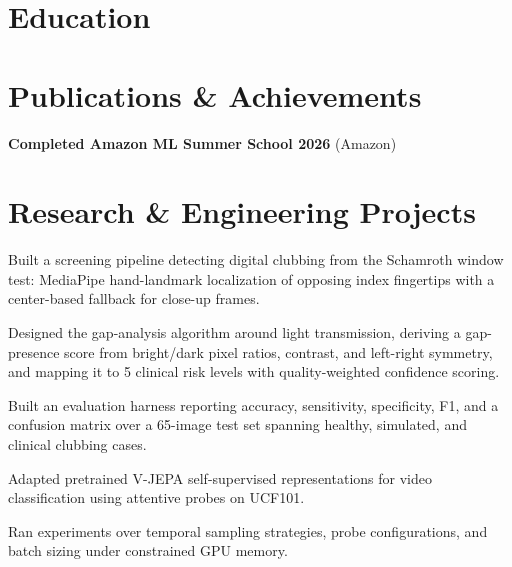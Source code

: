 \documentclass[a4paper,10pt]{article}
\begin{document}

\section{Education}
\eduschool

\section{Publications \& Achievements}
\begin{points}
  \item \ieeepaper
  \item \textbf{Completed Amazon ML Summer School 2026} (Amazon)
\end{points}

\section{Research \& Engineering Projects}

\begin{points}
  \item Built a screening pipeline detecting digital clubbing from the Schamroth window test: MediaPipe hand-landmark localization of opposing index fingertips with a center-based fallback for close-up frames.
  \item Designed the gap-analysis algorithm around light transmission, deriving a gap-presence score from bright/dark pixel ratios, contrast, and left-right symmetry, and mapping it to 5 clinical risk levels with quality-weighted confidence scoring.
  \item Built an evaluation harness reporting accuracy, sensitivity, specificity, F1, and a confusion matrix over a 65-image test set spanning healthy, simulated, and clinical clubbing cases.
\end{points}
\gap

\begin{points}
  \item Adapted pretrained V-JEPA self-supervised representations for video classification using attentive probes on UCF101.
  \item Ran experiments over temporal sampling strategies, probe configurations, and batch sizing under constrained GPU memory.
\end{points}
\gap
\end{document}
